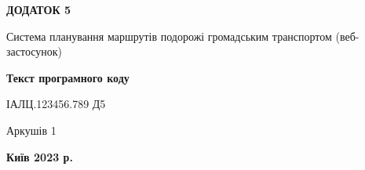 \clearpage
\begin{center}
{\fontsize{18}{22}\selectfont
\textbf{\uppercase{Додаток 5}}
}

{\fontsize{16}{29}\selectfont
\bigbreak
\bigbreak
Система планування маршрутів подорожі громадським транспортом (веб-
застосунок)
}

\vspace*{\fill}

{\fontsize{18}{22}\selectfont
\textbf{Текст програмного коду}

ІАЛЦ.123456.789 Д5
}

\vfill

{\fontsize{16}{29}\selectfont
Аркушів 1
}
\vfill %

\textbf{Київ 2023 р.}
\end{center}
\clearpage

